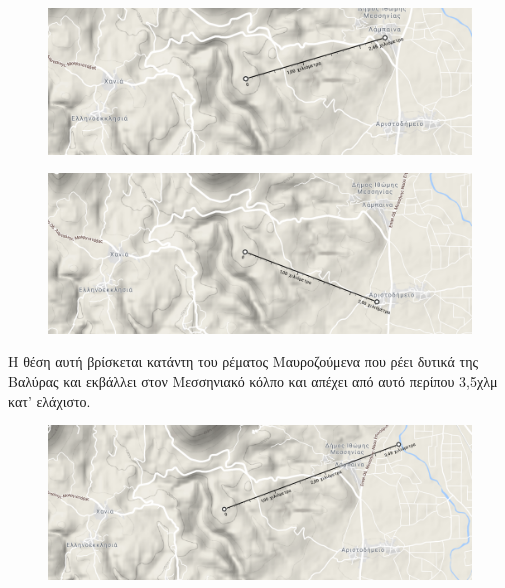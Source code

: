 \documentclass[12pt]{article}
\begin{document}
	\begin{figure} [H]
		\begin{center}
			\includegraphics [scale = 0.55] {map16.png}
		\end{center}
	\end{figure}

	\begin{figure} [H]
		\begin{center}
			\includegraphics [scale = 0.55] {map17.png}
		\end{center}
	\end{figure}

	Η θέση αυτή βρίσκεται κατάντη του ρέματος Μαυροζούμενα που ρέει δυτικά της Βαλύρας και εκβάλλει στον Μεσσηνιακό κόλπο και απέχει από αυτό περίπου 3,5χλμ κατ’ ελάχιστο.
	
	\begin{figure} [H]
		\begin{center}
			\includegraphics [scale = 0.55] {map18.png}
		\end{center}
	\end{figure}
	
\end{document}
